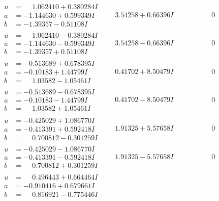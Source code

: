 \documentclass[1p]{elsarticle_modified}
\theoremstyle{definition}
\begin{document}
$$\begin{array}{c|c|c}
\begin{aligned}
u &= \phantom{-}1.062410 + 0.380284 I \\
a &= -1.144630 + 0.599349 I \\
b &= -1.39357 - 0.51108 I\end{aligned}
 & \phantom{-}3.54258 + 0.66396 I & \phantom{-0.000000 } 0 \\ \hline\begin{aligned}
u &= \phantom{-}1.062410 - 0.380284 I \\
a &= -1.144630 - 0.599349 I \\
b &= -1.39357 + 0.51108 I\end{aligned}
 & \phantom{-}3.54258 - 0.66396 I & \phantom{-0.000000 } 0 \\ \hline\begin{aligned}
u &= -0.513689 + 0.678395 I \\
a &= -0.10183 + 1.44799 I \\
b &= \phantom{-}1.03582 - 1.05461 I\end{aligned}
 & \phantom{-}0.41702 + 8.50479 I & \phantom{-0.000000 } 0 \\ \hline\begin{aligned}
u &= -0.513689 - 0.678395 I \\
a &= -0.10183 - 1.44799 I \\
b &= \phantom{-}1.03582 + 1.05461 I\end{aligned}
 & \phantom{-}0.41702 - 8.50479 I & \phantom{-0.000000 } 0 \\ \hline\begin{aligned}
u &= -0.425029 + 1.086770 I \\
a &= -0.413391 + 0.592418 I \\
b &= \phantom{-}0.700812 - 0.301259 I\end{aligned}
 & \phantom{-}1.91325 + 5.57658 I & \phantom{-0.000000 } 0 \\ \hline\begin{aligned}
u &= -0.425029 - 1.086770 I \\
a &= -0.413391 - 0.592418 I \\
b &= \phantom{-}0.700812 + 0.301259 I\end{aligned}
 & \phantom{-}1.91325 - 5.57658 I & \phantom{-0.000000 } 0 \\ \hline\begin{aligned}
u &= \phantom{-}0.496443 + 0.664464 I \\
a &= -0.910416 + 0.679661 I \\
b &= \phantom{-}0.816921 - 0.775446 I\end{aligned}

\end{array}$$
\end{document}
